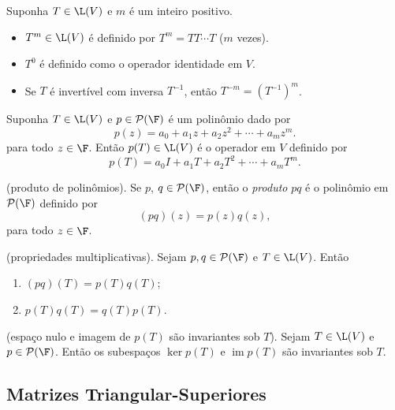 \documentclass{article}
\DeclareMathOperator{\im}{im}
\begin{document}
\begin{defn}
    Suponha \(T \in \L(V)\) e \(m\) é um inteiro positivo.
    \begin{itemize}
        \item \(T^m \in \L(V)\) é definido por \(T^m = T T \cdots T\) (\(m\) vezes).
        \item \(T^0\) é definido como o operador identidade em \(V\).
        \item Se \(T\) é invertível com inversa \(T^{-1}\), então \(T^{-m} = (T^{-1})^m\).
    \end{itemize}
\end{defn}

\begin{defn}
    Suponha \(T \in \L(V)\) e \(p \in \mathcal{P}(\F)\) é um polinômio dado por
    \[    p(z) = a_0 + a_1 z + a_2 z^2 + \cdots + a_m z^m.\]
    \noindent para todo \(z \in \F\). Então \(p(T) \in \L(V)\) é o operador em \(V\) definido por
    \[    p(T) = a_0 I + a_1 T + a_2 T^2 + \cdots + a_m T^m.\]
\end{defn}

\begin{defn} (produto de polinômios).
    Se \(p\), \(q \in \mathcal{P}(\F)\), então o \emph{produto} \(pq\) é o polinômio em \(\mathcal{P}(\F)\) definido por
    \[    (pq)(z) = p(z) q(z),\]
    \noindent para todo \(z \in \F\).
\end{defn}

\begin{prop} (propriedades multiplicativas).
    Sejam \(p, q \in \mathcal{P}(\F)\) e \(T \in \L(V)\). Então
    \begin{enumerate}
        \item[(a)] \((pq)(T) = p(T) q(T)\);
        \item[(b)] \(p(T) q(T) = q(T) p(T)\).
    \end{enumerate}
\end{prop}

\begin{prop} (espaço nulo e imagem de \(p(T)\) são invariantes sob \(T\)).
    Sejam \(T \in \L(V)\) e \(p \in \mathcal{P}(\F)\). Então os subespaços \(\ker p(T)\) e \(\im p(T)\) são invariantes sob \(T\).
\end{prop}

\subsection{Matrizes Triangular-Superiores}
\end{document}
